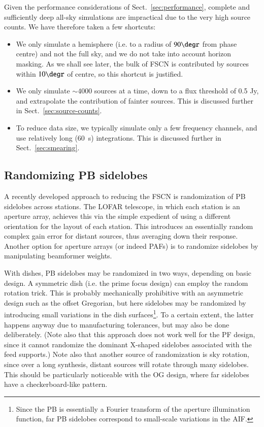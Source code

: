\documentclass{aa}
\begin{document}
Given the performance considerations of Sect.~\ref{sec:performance}, complete and sufficiently deep all-sky simulations are impractical due to the very high source counts. We have therefore taken a few shortcuts:

\begin{itemize}
  \item We only simulate a hemisphere (i.e. to a radius of $90\degr$ from phase centre) and not the full sky, and we do not take into account horizon masking. As we shall see later, the bulk of FSCN is contributed by sources within $10\degr$ of centre, so this shortcut is justified.
  \item We only simulate $\sim4000$ sources at a time, down to a flux threshold of 0.5 Jy, and extrapolate the contribution of fainter sources. This is discussed further in Sect.~\ref{sec:source-counts}.
  \item To reduce data size, we typically simulate only a few frequency channels, and use relatively long (60~s) integrations. This is discussed further in Sect.~\ref{sec:smearing}.
\end{itemize}

\subsection{Randomizing PB sidelobes}
\label{sec:randomizing}

A recently developed approach to reducing the FSCN is randomization of PB sidelobes across stations. The LOFAR telescope, in which each station is an aperture array, achieves this via the simple expedient of using a different orientation for the layout of each station. This introduces an essentially random complex gain error for distant sources, thus averaging down their response. Another option for aperture arrays (or indeed PAFs) is to randomize sidelobes by manipulating beamformer weights.

With dishes, PB sidelobes may be randomized in two ways, depending on basic design. A symmetric dish (i.e. the prime focus design) can employ the random rotation trick. This is probably mechanically prohibitive with an asymmetric design such as the offset Gregorian, but here sidelobes may be randomized by introducing small variations in the dish surfaces\footnote{Since the PB is essentially a Fourier transform of the aperture illumination function, far PB sidelobes correspond to small-scale variations in the AIF.}. To a certain extent, the latter happens anyway due to manufacturing tolerances, but may also be done deliberately. (Note also that this approach does not work well for the PF design, since it cannot randomize the dominant X-shaped sidelobes associated with the feed supports.) Note also that another source of randomization is sky rotation, since over a long synthesis, distant sources will rotate through many sidelobes. This should be particularly noticeable with the OG design, where far sidelobes have a checkerboard-like pattern.
\end{document}
